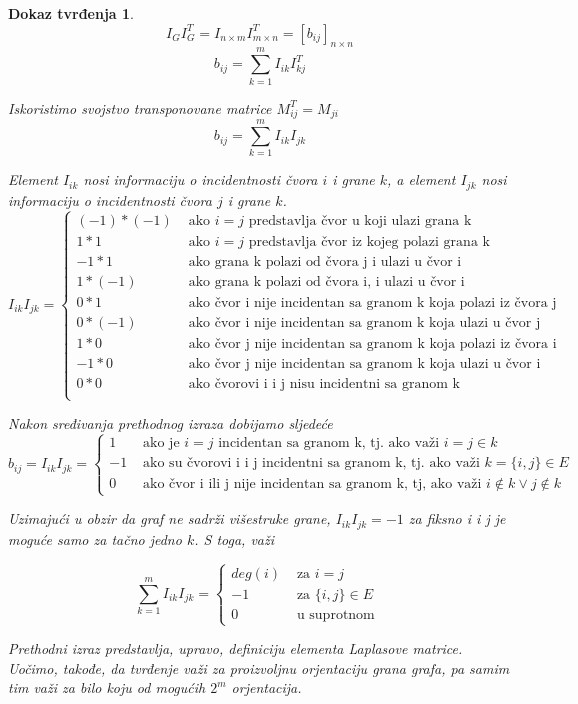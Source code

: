 \documentclass[11pt]{article}
\newtheorem*{custom_proof}{Dokaz tvrđenja}
\begin{document}
			\begin{custom_proof}
			\[
				I_G I_G^T = I_{n \times m}  I^T_{m \times n}  = [b_{ij}]_{n \times n}
			\]
			\[
				 b_{ij} = \sum_{k=1}^{m} I_{ik} I_{kj}^T
			\]

			Iskoristimo svojstvo transponovane matrice $M_{ij}^T = M_{ji}$
			\[
				 b_{ij} = \sum_{k=1}^{m} I_{ik} I_{jk}
			\]

			Element $I_{ik}$ nosi informaciju o incidentnosti čvora $i$ i grane $k$, a element $I_{jk}$ nosi informaciju o incidentnosti čvora $j$ i grane $k$.
			\[
				 I_{ik}I_{jk} =
				 \begin{cases}
				 (-1) * (-1) & \text{ ako } i = j \text{ predstavlja čvor u koji ulazi grana k } \\
				 1 * 1 & \text{ ako } i = j \text{ predstavlja čvor iz kojeg polazi grana k } \\
				 -1 * 1 & \text{ ako grana k polazi od čvora j i ulazi u čvor i} \\
				 1 * (-1) & \text{ ako grana k polazi od čvora i, i ulazi u čvor i} \\
				 0 * 1 & \text{ ako čvor i nije incidentan sa granom k koja polazi iz čvora j } \\ 
				 0 * (-1) & \text{ ako čvor i nije incidentan sa granom k koja ulazi u čvor j } \\ 
				 1 * 0 & \text{ ako čvor j nije incidentan sa granom k koja polazi iz čvora i } \\ 
				 -1 * 0 & \text{ ako čvor j nije incidentan sa granom k koja ulazi u čvor i } \\ 
				 0 * 0 & \text{ ako čvorovi i i j nisu incidentni sa granom k } \\ 
				 \end{cases}
			\]

			Nakon sređivanja prethodnog izraza dobijamo sljedeće
			\[
				 b_{ij} = I_{ik}I_{jk} =
				 \begin{cases}
				 1 & \text{ ako je } i = j \text{ incidentan sa granom k, tj. ako važi }  i = j \in k \\
				 -1 & \text{ ako su čvorovi i i j incidentni sa granom k, tj. ako važi } k = \{i,j\} \in E \\
				 0 & \text{ ako čvor i ili j nije incidentan sa granom k, tj, ako važi } i \notin k \lor j \notin k 
				 \end{cases}
			\]

			Uzimajući u obzir da graf ne sadrži višestruke grane, $I_{ik}I_{jk} = -1$ za fiksno i i j je moguće samo za tačno jedno $k$. S toga, važi
			
			\[
				\sum_{k=1}^{m} I_{ik}I_{jk} =
				 \begin{cases}
				deg(i)  & \text{ za } i = j \\
				 -1  & \text{ za } \{i,j\} \in E \\
				 0 & \text{ u suprotnom }
				 \end{cases}
			 \]

			Prethodni izraz predstavlja, upravo, definiciju elementa Laplasove matrice. Uočimo, takođe, da tvrđenje važi za proizvoljnu orjentaciju grana grafa, pa samim tim važi za bilo koju
		    od mogućih $2^m$ orjentacija.
			\end{custom_proof}
	
\end{document}
